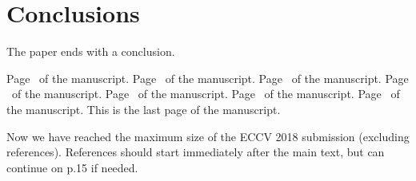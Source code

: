 \documentclass[runningheads]{llncs}
\begin{document}
\section{Conclusions}

The paper ends with a conclusion. 


\clearpage\mbox{}Page \thepage\ of the manuscript.
\clearpage\mbox{}Page \thepage\ of the manuscript.
\clearpage\mbox{}Page \thepage\ of the manuscript.
\clearpage\mbox{}Page \thepage\ of the manuscript.
\clearpage\mbox{}Page \thepage\ of the manuscript.
\clearpage\mbox{}Page \thepage\ of the manuscript.
\clearpage\mbox{}Page \thepage\ of the manuscript.
This is the last page of the manuscript.
\par\vfill\par
Now we have reached the maximum size of the ECCV 2018 submission (excluding references).
References should start immediately after the main text, but can continue on p.15 if needed.

\clearpage



\end{document}
